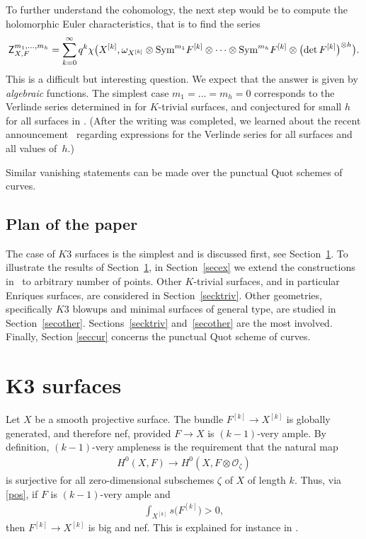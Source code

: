 \documentclass[10pt,a4paper]{amsart}
\numberwithin{equation}{section}
\newcommand{\sym}{\textnormal{Sym}}
\begin{document}
To further understand the cohomology, the next step would be to compute the holomorphic Euler characteristics, that is to find the series
 \begin{gather*}
 \mathsf Z_{X, F}^{m_1, \dots, m_h}=\sum_{k=0}^{\infty} q^k \chi \bigl(X^{[k]}, \omega_{X^{[k]}} \otimes \sym^{m_1}F^{[k]}\otimes \dots \otimes \sym^{m_h} F^{[k]}\otimes \bigl(\det F^{[k]}\bigr)^{\otimes h}\bigr).
 \end{gather*}
This is a difficult but interesting question. We expect that the answer is given by {\it algebraic} functions. The simplest case $m_1=\dots=m_h=0$ corresponds to the Verlinde series determined in \cite[Theorem~5.3]{EGL} for $K$-trivial surfaces, and conjectured for small $h$ for all surfaces in \cite[Section 1.6]{MOP}. (After the writing was completed, we learned about the recent announcement~\cite{G} regarding expressions for the Verlinde series for all surfaces and all values of~$h$.)

Similar vanishing statements can be made over the punctual Quot schemes of curves.

\subsection{Plan of the paper} The case of $K3$ surfaces is the simplest and is discussed first, see Section~\ref{seck3}. To illustrate the results of Section~\ref{seck3}, in Section~\ref{secex} we extend the constructions in~\cite{BBF} to arbitrary number of points. Other $K$-trivial surfaces, and in particular Enriques surfaces, are considered in Section~\ref{secktriv}. Other geometries, specifically $K3$ blowups and minimal surfaces of general type, are studied in Section~\ref{secother}. Sections~\ref{secktriv} and~\ref{secother} are the most involved. Finally, Section \ref{seccur} concerns the punctual Quot scheme of curves.

\section[K3 surfaces]{$\boldsymbol{K3}$ surfaces} \label{seck3} Let $X$ be a smooth projective surface. The bundle $F^{[k]}\to X^{[k]}$ is globally generated, and therefore nef, provided $F\to X$ is $(k-1)$-very ample. By definition, $(k-1)$-very ampleness is the requirement that the natural map
\begin{gather*}
H^0(X, F)\to H^0(X, F\otimes \mathcal O_{\zeta})
\end{gather*}
is surjective for all zero-dimensional subschemes $\zeta$ of $X$ of length $k$. Thus, via \eqref{pos}, if $F$ is $(k-1)$-very ample and
\begin{gather*}
\int_{X^{[k]}} s\big(F^{[k]}\big)>0,
\end{gather*}
then $F^{[k]}\to X^{[k]}$ is big and nef. This is explained for instance in \cite[Propositions~2.4 and~4.5]{BBF}.
\end{document}
